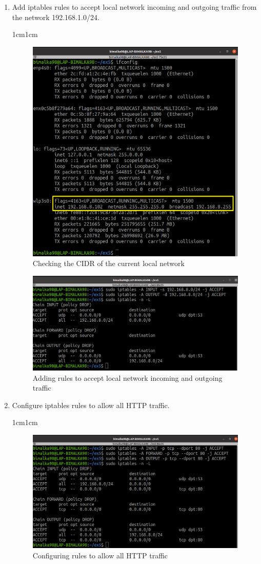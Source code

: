 \documentclass[11pt,letterpaper]{article}
\newenvironment{answer}{\em \color{blue} \begin{adjustwidth}{1cm}{1cm}}{\end{adjustwidth}}
\begin{document}
\begin{enumerate}
		\item Add iptables rules to accept local network incoming and outgoing traffic from the network 192.168.1.0/24. 
		\begin{answer}
			
			\begin{figure}[H]
				\centering
				\includegraphics[width=0.65\columnwidth]{images/part1/ifconfig.png}
				\caption{Checking the CIDR of the current local network}
			\end{figure}
			
			\begin{figure}[H]
				\centering
				\includegraphics[width=0.65\columnwidth]{images/part1/7.png}
				\caption{Adding rules to accept local network incoming and outgoing traffic}
			\end{figure}
		\end{answer}
		
		\item Configure iptables rules to allow all HTTP traffic.
		\begin{answer}
			\begin{figure}[H]
				\centering
				\includegraphics[width=0.65\columnwidth]{images/part1/8.png}
				\caption{Configuring rules to allow all HTTP traffic}
			\end{figure}
		\end{answer}
		

\end{enumerate}
\end{document}
